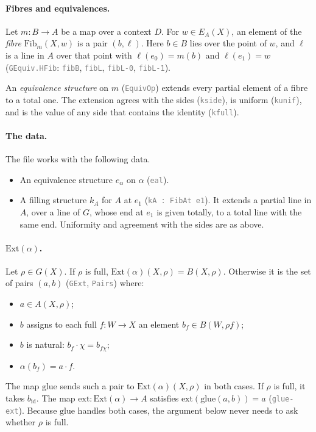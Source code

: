 \documentclass[11pt]{article}
\newcommand{\seg}[1]{\textcolor{gray}{\texttt{\small #1}}}
\newcommand{\Ext}{\mathrm{Ext}}
\newcommand{\ext}{\mathrm{ext}}
\newcommand{\glue}{\mathrm{glue}}
\newcommand{\Fib}{\mathrm{Fib}}
\theoremstyle{definition}
\theoremstyle{remark}
\begin{document}
\paragraph{Fibres and equivalences.}
Let $m:B\to A$ be a map over a context $D$. For $w\in E_A(X)$, an element of
the \emph{fibre} $\Fib_m(X,w)$ is a pair $(b,\ell)$. Here $b\in B$ lies over
the point of $w$, and $\ell$ is a line in $A$ over that point with
$\ell(e_0)=m(b)$ and $\ell(e_1)=w$ (\seg{GEquiv.HFib}: \seg{fibB},
\seg{fibL}, \seg{fibL-0}, \seg{fibL-1}).

An \emph{equivalence structure} on $m$ (\seg{EquivOp}) extends every partial
element of a fibre to a total one. The extension agrees with the sides
(\seg{kside}), is uniform (\seg{kunif}), and is the value of any side that
contains the identity (\seg{kfull}).

\paragraph{The data.}
The file works with the following data.
\begin{itemize}
\item An equivalence structure $e_\alpha$ on $\alpha$ (\seg{eal}).
\item A filling structure $k_A$ for $A$ at $e_1$ (\seg{kA : FibAt e1}). It
  extends a partial line in $A$, over a line of $G$, whose end at $e_1$ is
  given totally, to a total line with the same end. Uniformity and
  agreement with the sides are as above.
\end{itemize}

\paragraph{$\Ext(\alpha)$.}
Let $\rho\in G(X)$. If $\rho$ is full, $\Ext(\alpha)(X,\rho)=B(X,\rho)$.
Otherwise it is the set of pairs $(a,b)$ (\seg{GExt}, \seg{Pairs}) where:
\begin{itemize}
\item $a\in A(X,\rho)$;
\item $b$ assigns to each full $f:W\to X$ an element $b_f\in B(W,\rho f)$;
\item $b$ is natural: $b_f\cdot\chi=b_{f\chi}$;
\item $\alpha(b_f)=a\cdot f$.
\end{itemize}
The map $\glue$ sends such a pair to $\Ext(\alpha)(X,\rho)$ in both cases.
If $\rho$ is full, it takes $b_{\mathrm{id}}$. The map
$\ext:\Ext(\alpha)\to A$ satisfies $\ext(\glue(a,b))=a$
(\seg{glue-ext}). Because $\glue$ handles both cases, the argument below
never needs to ask whether $\rho$ is full.
\end{document}
